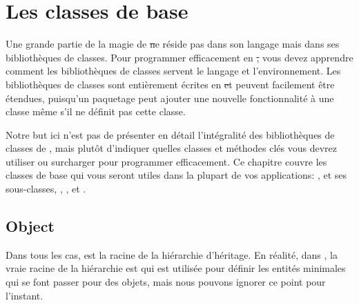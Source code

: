 \documentclass[a4paper,10pt,twoside]{book}
\begin{document}
	\renewcommand{\nnbb}[2]{} %
	\sloppy
\fi
\chapter{Les classes de base}
\label{cha:basic}
Une grande partie de la magie de \st ne r\'eside pas dans son langage mais dans ses biblioth\`eques de classes. Pour programmer efficacement en \st, vous devez apprendre comment les biblioth\`eques de classes servent le langage et l'environnement. Les biblioth\`eques de classes sont enti\`erement \'ecrites en \st et peuvent facilement \^etre \'etendues, puisqu'un paquetage peut ajouter une nouvelle fonctionnalit\'e \`a une classe m\^eme s'il ne d\'efinit pas cette classe. 

Notre but ici n'est pas de pr\'esenter en d\'etail l'int\'egralit\'e
des biblioth\`eques de classes de \sq, mais plut\^ot d'indiquer
quelles classes et m\'ethodes cl\'es vous devrez utiliser ou surcharger pour programmer efficacement. Ce chapitre couvre les classes de base qui vous seront utiles dans la plupart de vos applications: ,  et ses sous-classes, , ,  et .


\section{Object}

Dans tous les cas,  est la racine de la hi\'erarchie d'h\'eritage. En r\'ealit\'e, dans \sq , la vraie racine de la hi\'erarchie est  qui est utilis\'ee pour d\'efinir les entit\'es minimales qui se font passer pour des objets, mais nous pouvons ignorer ce point pour l'instant.
\end{document}
